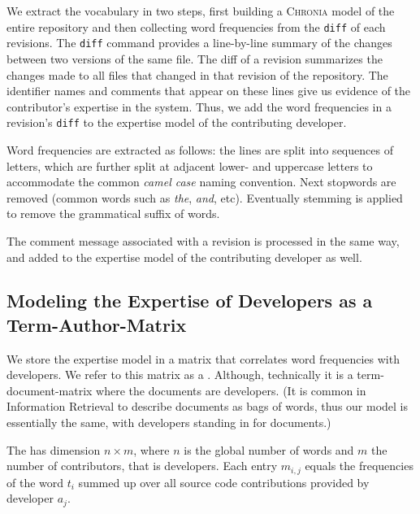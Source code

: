 \documentclass[10pt]{book}
\begin{document}
We extract the vocabulary in two steps, first building a \textsc{Chronia} model of the entire repository \cite{Girb05c} and then collecting word frequencies from the \verb$diff$ of each revisions. %
The \verb$diff$ command provides a line-by-line summary of the changes between two versions of the same file. The diff of a revision summarizes the changes made to all files that changed in that revision of the repository. The identifier names and comments that appear on these lines give us evidence of the contributor's expertise in the system. Thus, we add the word frequencies in a revision's \verb$diff$ to the expertise model of the contributing developer.

Word frequencies are extracted as follows: the lines are split into sequences of letters, which are further split at adjacent lower- and uppercase letters to accommodate the common \emph{camel case} naming convention. Next stopwords are removed (\ie common words such as \emph{the}, \emph{and}, etc). Eventually stemming %
is applied to remove the grammatical suffix of words.

The comment message associated with a revision is processed in the same way, and added to the expertise model of the contributing developer as well. 


\subsection{Modeling the Expertise of Developers as a Term-Author-Matrix}

We store the expertise model in a matrix that correlates word frequencies with developers. We refer to this matrix as a \TAM. Although, technically it is a term-document-matrix where the documents are developers. (It is common in Information Retrieval to describe documents as bags of words, thus our model is essentially the same, with developers standing in for documents.)

The \TAM has dimension $n \times m$, where $n$ is the global number of words and $m$ the number of contributors, that is developers. Each entry $m_{i,j}$ equals the frequencies of the word $t_i$ summed up over all source code contributions provided by developer $a_j$.
\end{document}
